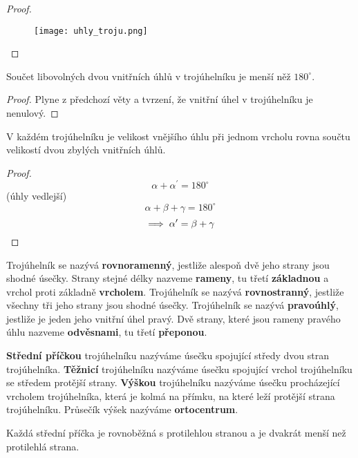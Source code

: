 \begin{proof}
    \,
    \begin{figure}[h!]
      \centering
      \texttt{[image: uhly\_troju.png]}
    \end{figure}
\end{proof}


\begin{veta}
  Součet libovolných dvou vnitřních úhlů v trojúhelníku je menší něž $180^\circ$.
\end{veta}

\begin{proof}
  Plyne z předchozí věty a tvrzení, že vnitřní úhel v trojúhelníku je nenulový.
\end{proof}

\begin{veta}
  V každém trojúhelníku je velikost vnějšího úhlu při jednom vrcholu rovna součtu velikostí dvou zbylých vnitřních úhlů.
\end{veta}

\begin{proof}
  $$\alpha + \alpha^\prime = 180^\circ$$ (úhly vedlejší)
  $$\alpha + \beta + \gamma = 180^\circ$$
  $$\implies \alpha^\prime = \beta + \gamma\qedhere$$
\end{proof}

\begin{definition}
  Trojúhelník se nazývá \textbf{rovnoramenný}, jestliže alespoň dvě jeho strany jsou shodné úsečky. Strany stejné délky nazveme \textbf{rameny}, tu třetí \textbf{základnou} a vrchol proti základně \textbf{vrcholem}.
  Trojúhelník se nazývá \textbf{rovnostranný}, jestliže všechny tři jeho strany jsou shodné úsečky.
  Trojúhelník se nazývá \textbf{pravoúhlý}, jestliže je jeden jeho vnitřní úhel pravý. Dvě strany, které jsou rameny pravého úhlu nazveme \textbf{odvěsnami}, tu třetí \textbf{přeponou}.
\end{definition}

\begin{definition}
  \textbf{Střední příčkou} trojúhelníku nazýváme úsečku spojující středy dvou stran trojúhelníka.
  \textbf{Těžnicí} trojúhelníku nazýváme úsečku spojující vrchol trojúhelníku se středem protější strany.
  \textbf{Výškou} trojúhelníku nazýváme úsečku procházející vrcholem trojúhelníka, která je kolmá na přímku, na které leží protější strana trojúhelníku. Průsečík výšek nazýváme \textbf{ortocentrum}.
\end{definition}

\begin{veta}
  Každá střední příčka je rovnoběžná s protilehlou stranou a je dvakrát menší než protilehlá strana.
\end{veta}

